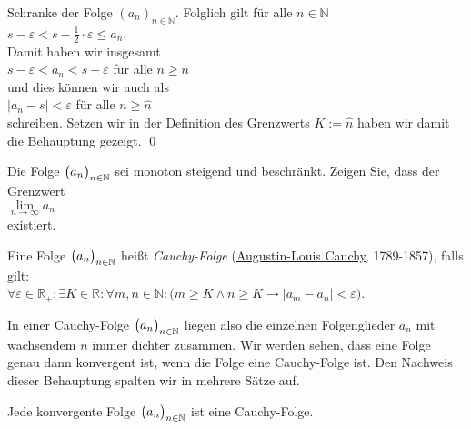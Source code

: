 Schranke der Folge $(a_n)_{n\in\mathbb{N}}$.  Folglich gilt f\"ur alle $n \in \mathbb{N}$
\\[0.2cm]
\hspace*{1.3cm}
$s - \varepsilon < s - \frac{1}{2} \cdot \varepsilon \leq a_n$.
\\[0.2cm]
Damit haben wir insgesamt
\\[0.2cm]
\hspace*{1.3cm}
$s - \varepsilon < a_n < s + \varepsilon$ \quad f\"ur alle $n \geq \widehat{n}$
\\[0.2cm]
und dies k\"onnen wir auch als
\\[0.2cm]
\hspace*{1.3cm}
$|a_n - s| < \varepsilon$ \quad f\"ur alle $n \geq \widehat{n}$
\\[0.2cm]
schreiben.  Setzen wir in der Definition des Grenzwerts $K := \widehat{n}$ haben wir damit die Behauptung gezeigt.
\qed


\exercise
Die Folge $\bigl(a_n\bigr)_{n\in\mathbb{N}}$ sei monoton steigend und beschr\"ankt.  Zeigen Sie, dass der Grenzwert
\\[0.2cm]
\hspace*{1.3cm}
$\lim\limits_{n\rightarrow\infty} a_n$
\\[0.2cm]
existiert.  \eox


\begin{Definition} \lb
Eine Folge $\bigl(a_n\bigr)_{n\in\mathbb{N}}$ hei\ss{}t \emph{Cauchy-Folge} 
(\href{http://de.wikipedia.org/wiki/Augustin-Louis_Cauchy}{\textrm{Augustin-Louis Cauchy}}, 1789-1857), 
falls gilt:
\\[0.2cm]
\hspace*{1.3cm}
$\forall \varepsilon \in \mathbb{R}_+: \exists K \in \mathbb{R}: \forall m,n \in \mathbb{N}: \bigl(
  m \geq K \wedge n \geq K \rightarrow \bigl| a_m - a_n \bigr| < \varepsilon\bigr)
$. \eod
\end{Definition}

In einer Cauchy-Folge $\bigl(a_n\bigr)_{n\in\mathbb{N}}$ liegen also die einzelnen Folgenglieder $a_n$ mit wachsendem $n$
immer dichter zusammen.  Wir werden sehen, dass eine Folge genau dann konvergent ist, wenn die Folge
eine Cauchy-Folge ist.  Den Nachweis dieser Behauptung spalten wir in mehrere S\"atze auf.


\begin{Satz}
Jede konvergente Folge $\bigl(a_n\bigr)_{n\in\mathbb{N}}$ ist eine Cauchy-Folge.  
\end{Satz}



